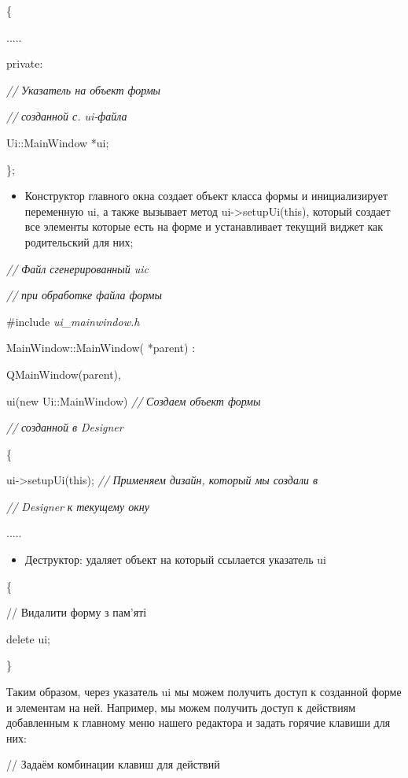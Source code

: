 \{

.....

private:

 \textit{//} \textit{Указатель на объект формы}\textit{ }

 \textit{//} \textit{созданной с. ui-файла}\textit{ }

 Ui::MainWindow *ui;  

\};

\begin{itemize}
\item Конструктор главного окна создает объект класса формы и инициализирует переменную ui, а также вызывает метод
ui-{>}setupUi(this), который создает все элементы которые есть на форме и устанавливает текущий виджет как
родительский для них; 
\end{itemize}
\textit{//} \textit{Файл сгенерированный uic}\textit{ }

\textit{//} \textit{при обработке файла формы}\textit{ }

\#include \textit{ui\_mainwindow.h}

MainWindow::MainWindow( *parent) :

 QMainWindow(parent),

 ui(new Ui::MainWindow) \textit{//} \textit{Создаем объект формы}\textit{ }

 \textit{//} \textit{созданной в Designer}\textit{ }

\{  

ui-{>}setupUi(this); \textit{//} \textit{Применяем дизайн, который мы создали в}

\textit{// Designer} \textit{к текущему окну}\textit{ }

.....

\begin{itemize}
\item Деструктор: удаляет объект на который ссылается указатель ui 
\end{itemize}

\{

 // Видалити форму з пам'яті

 delete ui;

\}

Таким образом, через указатель ui мы можем получить доступ к созданной форме и элементам на ней. Например, мы можем
получить доступ к действиям добавленным к главному меню нашего редактора и задать горячие клавиши для них: 

// Задаём комбинации клавиш для действий

